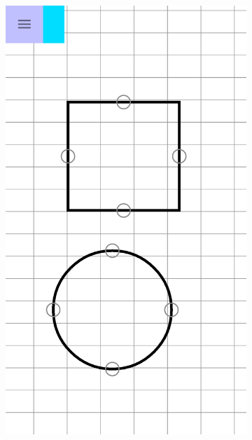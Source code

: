 \begin{itemize}
\begin{figure}[!h]
\begin{subfigure}[t]{.3\textwidth}
				\includegraphics[width=\textwidth]{img/screen/colladia_draw_view_element_2}
			\end{subfigure}
			~
			\begin{subfigure}[t]{.3\textwidth}

\end{subfigure}
\end{figure}
\end{itemize}
